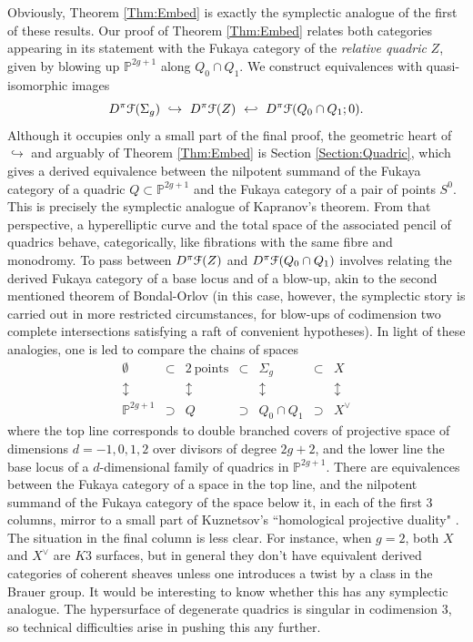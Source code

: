 \documentclass[reqno,10pt]{amsart}
\numberwithin{equation}{section}
\newcommand{\bP}{{\mathbb P}}
\newcommand{\scrF}{\EuScript{F}}
\theoremstyle{remark}
\begin{document}
Obviously, Theorem \ref{Thm:Embed} is exactly the symplectic analogue of the first of these results.  Our proof of Theorem \ref{Thm:Embed} relates both categories appearing in its statement with the Fukaya category of the \emph{relative quadric} $Z$, given by blowing up $\bP^{2g+1}$ along $Q_0\cap Q_1$. We construct  equivalences with quasi-isomorphic images
\[
D^{\pi}\scrF(\Sigma_g) \ \hookrightarrow \ D^{\pi}\scrF(Z) \ \hookleftarrow  \ D^{\pi}\scrF(Q_0\cap Q_1;0).
\]
Although it occupies only a small part of the final proof, the geometric heart of $\hookrightarrow$ and arguably of Theorem \ref{Thm:Embed} is Section \ref{Section:Quadric}, which gives a derived equivalence between the nilpotent summand of the Fukaya category of a quadric $Q \subset \bP^{2g+1}$ and the Fukaya category of a pair of points $S^0$.     This is precisely the symplectic analogue of Kapranov's theorem.  From that perspective, a hyperelliptic curve and the total space of the associated pencil of quadrics behave, categorically, like fibrations with the same fibre and monodromy.   To pass between $D^{\pi}\scrF(Z)$ and $D^{\pi} \scrF(Q_0 \cap Q_1)$ involves relating the derived Fukaya category of a base locus and of a blow-up, akin to the second mentioned theorem of Bondal-Orlov (in this case, however, the symplectic story is carried out in more restricted circumstances, for blow-ups of codimension two complete intersections satisfying a raft of convenient hypotheses). In light of these analogies, one is led to  compare the chains of spaces
\begin{equation} \label{Eqn:Kuznetsov}
\begin{array}{ccccccc} 
\emptyset & \subset & 2 \ \textrm{points} & \subset & \Sigma_g & \subset & X \\
\updownarrow &  &\updownarrow & &\updownarrow & & \updownarrow \\ 
\bP^{2g+1} & \supset & Q & \supset & Q_0\cap Q_1 & \supset & X^{\vee} 
\end{array}
\end{equation}
where the top line corresponds to double branched covers of projective space of dimensions $d=-1,0,1,2$ over divisors of degree $2g+2$, and the lower line the base locus of a $d$-dimensional family of quadrics in $\bP^{2g+1}$.   There are equivalences between the Fukaya category of a space in the top line, and the nilpotent summand of the Fukaya category of the space below it, in each of the first 3 columns, mirror to a  small part of Kuznetsov's ``homological projective duality" \cite{Kuznetsov}.  The situation in the final column is less clear. For instance, when $g=2$, both $X$ and $X^{\vee}$ are $K3$ surfaces, but in general they don't have equivalent derived categories of coherent sheaves unless one introduces a twist by a class in the Brauer group.  It would be interesting to know whether this has any symplectic analogue. The hypersurface of degenerate quadrics is singular in codimension 3, so technical difficulties arise in pushing this any further.  
\end{document}

